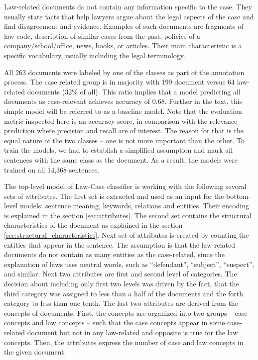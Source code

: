 \documentclass[
  digital, %
  notable,   %
  nolof,     %
  nolot,     %
]{fithesis3}
\begin{document}
Law-related documents do not contain any information specific to the case.
They usually state facts that help lawyers argue about the legal aspects of the case and find disagreement and evidence.
Examples of such documents are fragments of law code, description of similar cases from the past, policies of a company/school/office, news, books, or articles.
Their main characteristic is a specific vocabulary, usually including the legal terminology.

All 263 documents were labeled by one of the classes as part of the annotation process.
The case related group is in majority with 199 document versus 64 law-related documents (32\% of all).
This ratio implies that a model predicting all documents as case-relevant achieves accuracy of 0.68.
Further in the text, this simple model will be referred to as a baseline model.
Note that the evaluation metric inspected here is an accuracy score, in comparison with the relevance prediction where precision and recall are of interest.
The reason for that is the equal nature of the two classes -- one is not more important than the other.
To train the models, we had to establish a simplified assumption and mark all sentences with the same class as the document.
As a result, the models were trained on all 14,368 sentences.

The top-level model of Law-Case classifier is working with the following several sets of attributes.
The first set is extracted and used as an input for the bottom-level models: sentence meaning, keywords, relations and entities.
Their encoding is explained in the section \ref{sec:attributes}.
The second set contains the structural characteristics of the document as explained in the section \ref{sec:structural_characteristics}.
Next set of attributes is created by counting the entities that appear in the sentence.
The assumption is that the law-related documents do not contain as many entities as the case-related, since the explanation of laws uses neutral words, such as ``defendant'', ``subject'', ``suspect'', and similar.
Next two attributes are first and second level of categories.
The decision about including only first two levels was driven by the fact, that the third category was assigned to less than a half of the documents and the forth category to less than one tenth.
The last two attributes are derived from the concepts of documents.
First, the concepts are organized into two groups -- case concepts and law concepts -- such that the case concepts appear in some case-related document but not in any law-related and opposite is true for the law concepts.
Then, the attributes express the number of case and law concepts in the given document.
\end{document}

